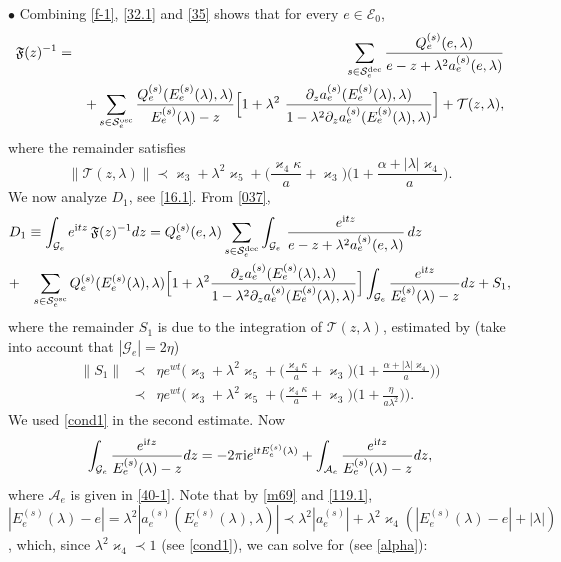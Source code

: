 \documentclass[letterpaper,onecolumn,11pt,accepted=2021-12-09]{quantumarticle}
\numberwithin{equation}{section}
\newcommand{\aes}{a_e^{(s)}}
\newcommand{\Qes}{Q_e^{(s)}}
\newcommand{\Ees}{E_e^{(s)}(\lambda)}
\renewcommand{\i}{{\rm i}}
\begin{document}
$\bullet$ Combining \eqref{f-1}, \eqref{32.1} and \eqref{35} shows that for every $e\in{\mathcal E}_0$,
\begin{eqnarray}
{\mathfrak F}(z)^{-1} &=& \sum_{s\in{\mathcal S}_e^{\rm dec}}  \frac{\Qes(e,\lambda)}{e-z+\lambda^2 \aes(e,\lambda) }  \label{037}\\
&&  + \sum_{s\in{\mathcal S}_e^{\rm osc}} \frac{\Qes(\Ees,\lambda)}{\Ees-z}\Big[ 1+\lambda^2  \  \frac{\partial_z\aes(\Ees,\lambda)}{1-\lambda^2\partial_z
	\aes(\Ees,\lambda)}\Big] +{\mathcal T}(z,\lambda),
\nonumber
\end{eqnarray}
where the remainder satisfies
\begin{equation}
\|{\mathcal T}(z,\lambda) \|
 \prec \varkappa_3+\lambda^2\varkappa_5 + \Big( \frac{\varkappa_4\kappa}{a} +\varkappa_3\Big)  \Big( 1+\frac{\alpha+|\lambda|\varkappa_4}{a}\Big).
\label{57.1}
\end{equation}
We now analyze $D_1$, see \eqref{16.1}. From \eqref{037},  
\begin{eqnarray}
	\lefteqn{
D_1\equiv \int_{{\mathcal G}_e} e^{\i t z} \, {\mathfrak F}(z)^{-1} dz =\Qes(e,\lambda) \sum_{s\in{\mathcal S}_e^{\rm dec}}  \int_{{\mathcal G}_e}  \,  \frac{e^{\i t z}}{e-z+\lambda^2 \aes(e,\lambda)} \, dz \ }\label{24}\\
&+& \sum_{s\in{\mathcal S}_e^{\rm osc}} \Qes(\Ees,\lambda) \Big[1+\lambda^2  \frac{\partial_z\aes(\Ees,\lambda)}{1-\lambda^2\partial_z
	\aes(\Ees,\lambda)}\Big] \int_{{\mathcal G}_e} \frac{e^{\i tz}}{\Ees-z} dz	 + S_1, \nonumber
\end{eqnarray}
where the remainder $S_1$ is due to the integration of ${\mathcal T}(z,\lambda)$, estimated by (take into account that $|{\mathcal G}_e| =2\eta$)
\begin{eqnarray}
\|S_1\|  &\prec& \eta e^{wt}\Big( \varkappa_3+\lambda^2\varkappa_5 + \Big( \frac{\varkappa_4\kappa}{a} +\varkappa_3\Big)  \Big( 1+\frac{\alpha+|\lambda|\varkappa_4}{a}\Big) \Big)\nonumber\\
&\prec& \eta e^{wt}\Big( \varkappa_3+\lambda^2\varkappa_5 + \Big( \frac{\varkappa_4\kappa}{a} +\varkappa_3\Big)  \Big( 1+\frac{\eta}{a\lambda^2}\Big) \Big).\nonumber
\end{eqnarray}
We used \eqref{cond1} in the second estimate. Now
\begin{equation}
\int_{{\mathcal G}_e} \frac{e^{\i t z} }{\Ees-z}  d z  = -2\pi\i e^{\i t\Ees}  + \int_{{\mathcal A}_e}  \frac{e^{\i t z}}{\Ees-z}  d z,
\label{m88}
\end{equation}
where ${\mathcal A}_e$ is given in \eqref{40-1}.  Note that by \eqref{m69} and \eqref{119.1}, $|\Ees-e| = \lambda^2 |\aes(\Ees,\lambda)| \prec \lambda^2|\aes| +\lambda^2 \varkappa_4 (|\Ees-e| +|\lambda|)$, which, since $\lambda^2\varkappa_4 \prec 1$ (see \eqref{cond1}),  we can solve for (see \eqref{alpha}):
\end{document}
